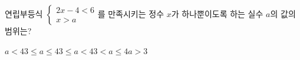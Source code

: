 연립부등식 $\begin{cases} 2x-4<6 \\ x>a \end{cases}$를 만족시키는 정수 $x$가 하나뿐이도록 하는 실수 $a$의 값의 범위는?
\begin{choices32}{$a<4$}{$3\le a\le 4$}{$3\le a<4$}{$3<a\le 4$}{$a>3$}\end{choices32}

